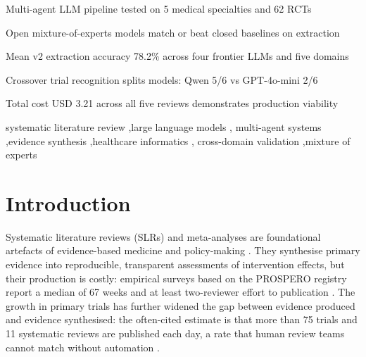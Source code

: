 \documentclass[a4paper,fleqn]{cas-sc}
\begin{document}
\begin{highlights}
\item Multi-agent LLM pipeline tested on 5 medical specialties and 62 RCTs
\item Open mixture-of-experts models match or beat closed baselines on extraction
\item Mean v2 extraction accuracy 78.2\% across four frontier LLMs and five domains
\item Crossover trial recognition splits models: Qwen 5/6 vs GPT-4o-mini 2/6
\item Total cost USD 3.21 across all five reviews demonstrates production viability
\end{highlights}

\begin{keywords}
systematic literature review \sep large language models \sep
multi-agent systems \sep evidence synthesis \sep healthcare informatics \sep
cross-domain validation \sep mixture of experts
\end{keywords}

\maketitle

\linenumbers

\section{Introduction}\label{sec:intro}

Systematic literature reviews (SLRs) and meta-analyses are foundational
artefacts of evidence-based medicine and policy-making
\citep{higgins2019cochrane,page2021prisma}. They synthesise primary
evidence into reproducible, transparent assessments of intervention
effects, but their production is costly: empirical surveys based on the
PROSPERO registry report a median of 67 weeks and at least
two-reviewer effort to publication
\citep{borah2017slrtime,allen1999estimatingtime}. The growth in primary
trials has further widened the gap between evidence produced and evidence
synthesised: the often-cited estimate is that more than 75 trials and
11 systematic reviews are published each day, a rate that human
review teams cannot match without automation
\citep{bastian2010seventyfive,elliott2017living}.
\end{document}
